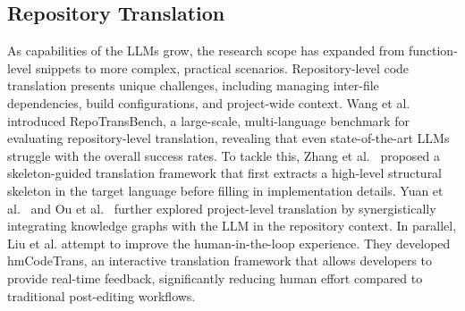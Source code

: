 \subsection{Repository Translation}

As capabilities of the LLMs grow, the research scope has expanded from function-level snippets to more complex, practical scenarios. Repository-level code translation presents unique challenges, including managing inter-file dependencies, build configurations, and project-wide context. Wang et al. \cite{wang2024repotransbench} introduced RepoTransBench, a large-scale, multi-language benchmark for evaluating repository-level translation, revealing that even state-of-the-art LLMs struggle with the overall success rates. To tackle this, Zhang et al.~\cite{zhang2025skeleton} proposed a skeleton-guided translation framework that first extracts a high-level structural skeleton in the target language before filling in implementation details. Yuan et al.~\cite{yuan2025project} and Ou et al.~\cite{K3Trans2025} further explored project-level translation by synergistically integrating knowledge graphs with the LLM in the repository context. In parallel, Liu et al.\cite{liu2024hmcodetrans} attempt to improve the human-in-the-loop experience. They developed hmCodeTrans, an interactive translation framework that allows developers to provide real-time feedback, significantly reducing human effort compared to traditional post-editing workflows.



